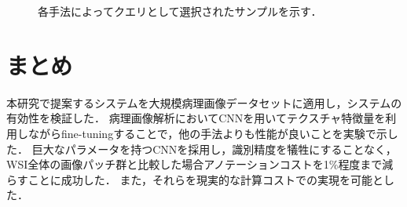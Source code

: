 \begin{figure}[hbp]
  \begin{center}

  \caption{\label{figure:camelyon_query_examples}各手法によってクエリとして選択されたサンプルを示す．}
  \end{center}
\end{figure}


\section{まとめ}
本研究で提案するシステムを大規模病理画像データセットに適用し，システムの有効性を検証した．
病理画像解析においてCNNを用いてテクスチャ特徴量を利用しながらfine-tuningすることで，他の手法よりも性能が良いことを実験で示した．
巨大なパラメータを持つCNNを採用し，識別精度を犠牲にすることなく，WSI全体の画像パッチ群と比較した場合アノテーションコストを1$\%$程度まで減らすことに成功した．
また，それらを現実的な計算コストでの実現を可能とした．
